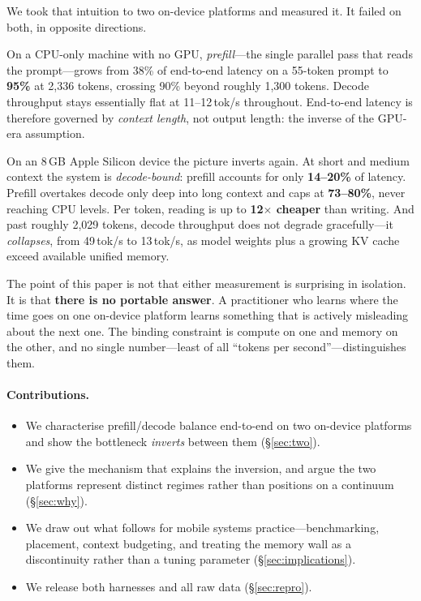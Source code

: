 \documentclass[sigconf,nonacm,10pt]{acmart}
\begin{document}
We took that intuition to two on-device platforms and measured it. It failed on both, in opposite directions.

On a CPU-only machine with no GPU, \emph{prefill}---the single parallel pass that reads the prompt---grows from
38\% of end-to-end latency on a 55-token prompt to \textbf{95\%} at 2{,}336 tokens, crossing 90\% beyond roughly
1{,}300 tokens. Decode throughput stays essentially flat at 11--12\,tok/s throughout. End-to-end latency is
therefore governed by \emph{context length}, not output length: the inverse of the GPU-era assumption.

On an 8\,GB Apple Silicon device the picture inverts again. At short and medium context the system is
\emph{decode-bound}: prefill accounts for only \textbf{14--20\%} of latency. Prefill overtakes decode only deep
into long context and caps at \textbf{73--80\%}, never reaching CPU levels. Per token, reading is up to
\textbf{12$\times$ cheaper} than writing. And past roughly 2{,}029 tokens, decode throughput does not degrade
gracefully---it \emph{collapses}, from 49\,tok/s to 13\,tok/s, as model weights plus a growing KV cache exceed
available unified memory.

The point of this paper is not that either measurement is surprising in isolation. It is that \textbf{there is
no portable answer}. A practitioner who learns where the time goes on one on-device platform learns something
that is actively misleading about the next one. The binding constraint is compute on one and memory on the
other, and no single number---least of all ``tokens per second''---distinguishes them.

\paragraph{Contributions.}
\begin{itemize}
  \item We characterise prefill/decode balance end-to-end on two on-device platforms and show the bottleneck
        \emph{inverts} between them (\S\ref{sec:two}).
  \item We give the mechanism that explains the inversion, and argue the two platforms represent distinct
        regimes rather than positions on a continuum (\S\ref{sec:why}).
  \item We draw out what follows for mobile systems practice---benchmarking, placement, context budgeting, and
        treating the memory wall as a discontinuity rather than a tuning parameter (\S\ref{sec:implications}).
  \item We release both harnesses and all raw data (\S\ref{sec:repro}).
\end{itemize}
\end{document}
